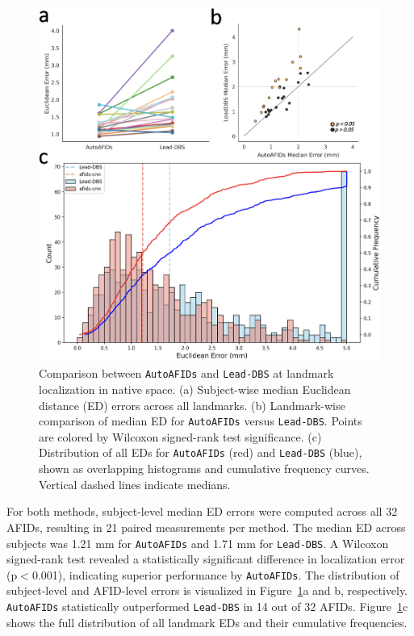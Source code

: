 \begin{figure}[hbt!]
    \centering
    \includegraphics[width=0.95\linewidth]{figs/ch3_Figure_cnnvslead2.png}
    \caption{Comparison between \texttt{AutoAFIDs} and \texttt{Lead-DBS} at landmark localization in native space. (a) Subject-wise median Euclidean distance (ED) errors across all landmarks. (b) Landmark-wise comparison of median ED for \texttt{AutoAFIDs} versus \texttt{Lead-DBS}. Points are colored by Wilcoxon signed-rank test significance. (c) Distribution of all EDs for \texttt{AutoAFIDs} (red) and \texttt{Lead-DBS} (blue), shown as overlapping histograms and cumulative frequency curves. Vertical dashed lines indicate medians.}
    \label{fig:ch3_Figure_cnnvslead}
\end{figure}

For both methods, subject-level median ED errors were computed across all 32 AFIDs, resulting in 21 paired measurements per method. The median ED across subjects was 1.21 mm for \texttt{AutoAFIDs} and 1.71 mm for \texttt{Lead-DBS}. A Wilcoxon signed-rank test revealed a statistically significant difference in localization error (p\(<\)0.001), indicating superior performance by \texttt{AutoAFIDs}. The distribution of subject-level and AFID-level errors is visualized in Figure~\ref{fig:ch3_Figure_cnnvslead}a and b, respectively. \texttt{AutoAFIDs} statistically outperformed \texttt{Lead-DBS} in 14 out of 32 AFIDs. Figure~\ref{fig:ch3_Figure_cnnvslead}c shows the full distribution of all landmark EDs and their cumulative frequencies.

